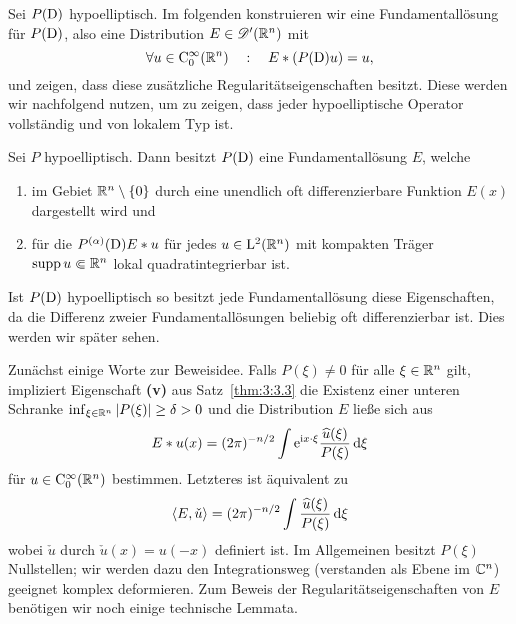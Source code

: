 Sei $P(\mathrm D)$ hypoelliptisch. Im folgenden konstruieren wir eine Fundamentallösung für $P(\mathrm D)$, also eine Distribution $E\in\mathscr D'(\mathbb R^n)$ mit
\begin{equation}
\forall u\in\mathrm C_0^\infty(\mathbb R^n)\quad:\quad E*(P(\mathrm D) u) = u,
\end{equation}
und zeigen, dass diese zusätzliche Regularitätseigenschaften besitzt. Diese werden wir nachfolgend nutzen, um zu zeigen, dass jeder hypoelliptische Operator vollständig und von lokalem Typ ist. 
\begin{thm}\label{fundamental_exist}
Sei $P$ hypoelliptisch. Dann besitzt $P(\mathrm D)$ eine Fundamentallösung $E$, welche 
\begin{enumerate}
\item im Gebiet $\mathbb R^n\setminus\{0\}$  durch eine unendlich oft differenzierbare Funktion $E(x)$ dargestellt wird und
\item für die $P^{(\alpha)}(\mathrm D) E*u$ für jedes $u\in \mathrm L^2(\mathbb R^n)$ mit kompakten Träger $\operatorname{supp} u\Subset\mathbb R^n$ lokal quadratintegrierbar ist. 
\end{enumerate}
\end{thm}
\begin{rem}
Ist $P(\mathrm D)$ hypoelliptisch so besitzt jede Fundamentallösung diese Eigenschaften, da die Differenz zweier Fundamentallösungen beliebig oft differenzierbar ist. Dies werden wir später sehen.
\end{rem}

Zunächst einige Worte zur Beweisidee.  Falls $P(\xi)\neq 0$ für alle $\xi\in \mathbb R^n$ gilt, impliziert  Eigenschaft {\bf (v)} aus Satz~\ref{thm:3:3.3}  die Existenz einer unteren Schranke
$\inf_{\xi\in\mathbb R^n} |P(\xi)|\ge\delta>0$ und die Distribution $E$ ließe sich aus
\begin{equation}\label{distr1}
E*u(x) = (2\pi)^{-n/2}\int \mathrm e^{\mathrm i x\cdot \xi} \frac{\widehat u(\xi)}{P(\xi)}\,\mathrm d \xi
\end{equation}
für $u\in\mathrm C_0^\infty(\mathbb R^n)$ bestimmen. Letzteres ist  äquivalent zu
\begin{equation}\label{distr2}
\langle E,\check u\rangle = (2\pi)^{-n/2} \int \frac{\widehat u(\xi)}{P(\xi)}\,\mathrm d \xi
\end{equation}
wobei $\check u$ durch $\check u(x)=u(-x)$ definiert ist. Im Allgemeinen besitzt $P(\xi)$ Nullstellen; wir werden dazu den Integrationsweg (verstanden als Ebene im $\mathbb C^n$) geeignet komplex deformieren. Zum Beweis der Regularitätseigenschaften von $E$ benötigen wir noch einige technische Lemmata.


